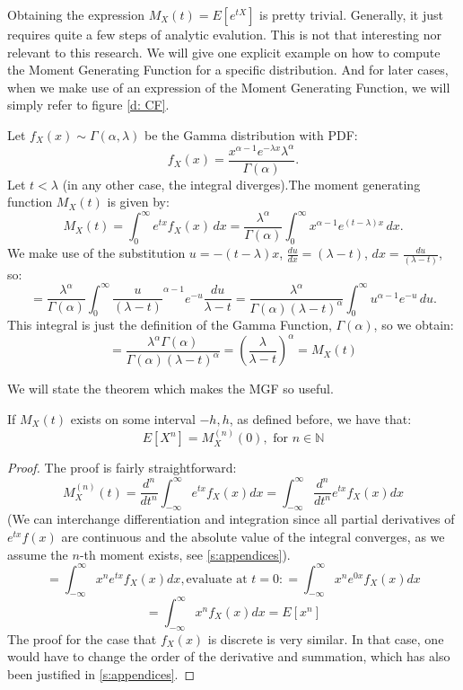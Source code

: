 \begin{remark}
    Obtaining the expression \(M_X(t) = E[e^{tX}]\) is pretty trivial. Generally, it just requires quite a few steps of analytic evalution. This is not that interesting nor relevant to this research. We will give one explicit example on how to compute the Moment Generating Function for a specific distribution. And for later cases, when we make use of an expression of the Moment Generating Function, we will simply refer to figure \ref{d: CF}.
\end{remark}

\begin{example}
    Let \(f_X(x) \sim \Gamma(\alpha, \lambda)\) be the Gamma distribution with PDF:
     \[
     f_X(x) = \frac{x^{\alpha -1} e^{-\lambda x} \lambda^\alpha}{\Gamma(\alpha)}.
     \]
     Let \( t < \lambda\) (in any other case, the integral diverges).The moment generating function \(M_X(t)\) is given by:
     \[
     M_X(t) = \int_{0}^{\infty} e^{tx} f_X(x) \, dx = \frac{\lambda^\alpha}{\Gamma(\alpha)} \int_{0}^{\infty} x^{\alpha -1} e^{(t - \lambda) x} \, dx.
     \]
     We make use of the substitution \(u = -(t - \lambda)x\), \(\frac{du}{dx} = (\lambda - t)\), \(dx = \frac{du}{(\lambda - t)}\), so:
     \[
     = \frac{\lambda^\alpha}{\Gamma(\alpha)} \int_{0}^{\infty} \frac{u}{(\lambda - t)}^{\alpha -1} e^{-u} \frac{du}{\lambda - t} = \frac{\lambda^\alpha}{\Gamma(\alpha) (\lambda - t)^\alpha} \int_{0}^{\infty} u^{\alpha -1} e^{-u} \, du.
     \] This integral is just the definition of the Gamma Function, \(\Gamma(\alpha)\), so we obtain:
     \[ = \frac{\lambda^\alpha \Gamma(\alpha)}{\Gamma(\alpha) (\lambda - t)^\alpha} = (\frac{\lambda}{\lambda - t})^\alpha = M_X(t)\]
 \end{example}
 
We will state the theorem which makes the MGF so useful.
\begin{theorem}\label{t: mgf}
    If \(M_X(t)\) exists on some interval \(-h, h\), as defined before, we have that:
    \[ E[X^n] = M_X^{(n)}(0), \text{ for } n \in \mathbb{N}\]
\end{theorem}

\begin{proof}
    The proof is fairly straightforward:
    \[M_X^{(n)}(t) = \frac{d^n}{dt^n} \int_{-\infty}^{\infty} e^{tx} f_X(x) dx = \int_{-\infty}^{\infty} \frac{d^n}{dt^n} e^{tx} f_X(x) dx\] (We can interchange differentiation and integration since all partial derivatives of \(e^{tx} f(x)\) are continuous and the absolute value of the integral converges, as we assume the \(n\)-th moment exists, see \ref{s:appendices}).
    \[ = \int_{-\infty}^{\infty} x^n e^{tx} f_X(x) dx, \text{evaluate at } t = 0: = \int_{-\infty}^{\infty} x^n e^{0x} f_X(x) dx\]
    \[ = \int_{-\infty}^{\infty} x^n f_X(x) dx = E[x^n]\]
    The proof for the case that \(f_X(x)\) is discrete is very similar. In that case, one would have to change the order of the derivative and summation, which has also been justified in \ref{s:appendices}.
\end{proof}

